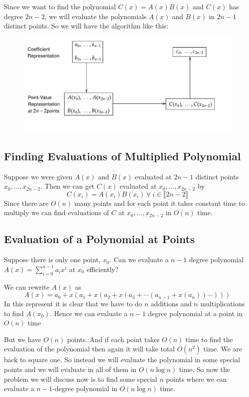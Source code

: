 Since we want to find the polynomial $C(x)=A(x)B(x)$ and $C(x)$ has degree $2n-2$, we will evaluate the polynomials $A(x)$ and $B(x)$ in $2n-1$ distinct points. So we will have the algorithm like this:
\begin{figure}[h]
	\centering
	\includegraphics{images/poly-mult}
\end{figure}
\subsection{Finding Evaluations of Multiplied Polynomial}

Suppose we were given $A(x)$ and $B(x)$ evaluated at $2n-1$ distinct points $x_0,\dots, x_{2n-2}$. Then we can get $C(x)$ evaluated at $x_0,\dots, x_{2n-2}$ by $$C(x_i)=A(x_i)B(x_i)\ \forall\ i\in \llbracket 2n-2\rrbracket$$Since there are $O(n)$ many points and for each point it takes constant time to multiply we can find evaluations of $C$ at $x_0,\dots, x_{2n-2}$ in $ O(n)$ time.
\subsection{Evaluation of a Polynomial at Points}
\begin{question}{}{}
	Suppose there is only one point, $x_0$. Can we evaluate a $n-1$ degree polynomial $A(x)=\sum\limits_{i=0}^{n-1}a_ix^i$ at $x_0$ efficiently?
\end{question}
We can rewrite $A(x)$ as $$A(x)=a_0+x(a_1+x(a_2+x(a_3+\cdots (a_{n-1}+x(a_n))\cdots )))$$In this represent it is clear that we have to do $n$ additions and $n$ multiplications to find $A(x_0)$. Hence we can evaluate a $n-1$ degree polynomial at a point in $O(n)$ time


But we have $O(n)$ points. And if each point takes $O(n)$ time to find the evaluation of the polynomial then again it will take total $O(n^2)$ time. We are back to square one. So instead we will evaluate the polynomial in some special points and we will evaluate in all of them in $O(n\log n)$ time. So now the problem we will discuss now is to find some special $n$ points where we can evaluate a $n-1$-degree polynomial in $O(n\log n)$ time.
\parinf

